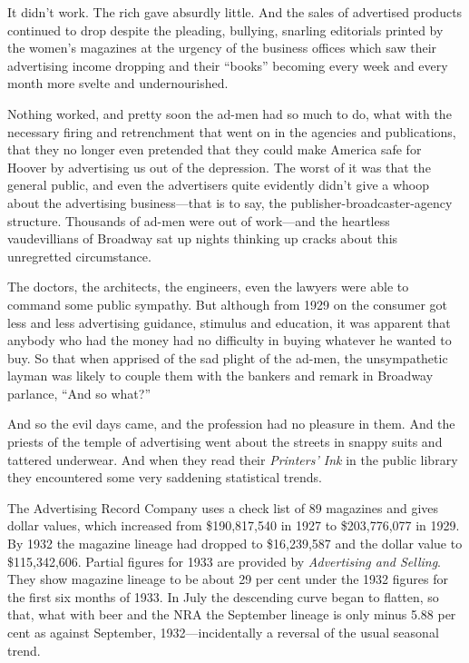 \documentclass[nohyper,openany,nobib]{tufte-book}
\begin{document}
It didn't work. The rich gave absurdly little. And the sales of
advertised products continued to drop despite the pleading, bullying,
snarling editorials printed by the women's magazines at the urgency of
the business offices which saw their advertising income dropping and
their ``books'' becoming every week and every month more svelte and
undernourished.

Nothing worked, and pretty soon the ad-men had so much to do, what with
the necessary firing and retrenchment that went on in the agencies and
publications, that they no longer even pretended that they could make
America safe for Hoover by advertising us out of the depression. The
worst of it was that the general public, and even the advertisers quite
evidently didn't give a whoop about the advertising business---that is
to say, the publisher-broadcaster-agency structure. Thousands of ad-men
were out of work---and the heartless vaudevillians of Broadway sat up
nights thinking up cracks about this unregretted circumstance.

The doctors, the architects, the engineers, even the lawyers were able
to command some public sympathy. But although from 1929 on the consumer
got less and less advertising guidance, stimulus and education, it was
apparent that anybody who had the money had no difficulty in buying
whatever he wanted to buy. So that when apprised of the sad plight of
the ad-men, the unsympathetic layman was likely to couple them with the
bankers and remark in Broadway parlance, ``And so what?''

And so the evil days came, and the profession had no pleasure in them.
And the priests of the temple of advertising went about the streets in
snappy suits and tattered underwear. And when they read their
\emph{Printers' Ink} in the public library they encountered some very
saddening statistical trends.

The Advertising Record Company uses a check list of 89 magazines and
gives dollar values, which increased from \$190,817,540 in 1927 to
\$203,776,077 in 1929. By 1932 the magazine lineage had dropped to
\$16,239,587 and the dollar value to \$115,342,606. Partial figures for
1933 are provided by \emph{Advertising and Selling}. They show magazine
lineage to be about 29 per cent under the 1932 figures for the first six
months of 1933. In July the descending curve began to flatten, so that,
what with beer and the NRA the September lineage is only minus 5.88 per
cent as against September, 1932---incidentally a reversal of the usual
seasonal trend.
\end{document}
